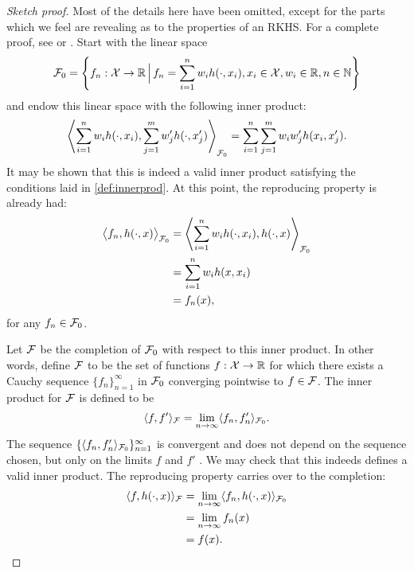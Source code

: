 \begin{proof}[Sketch proof]
  Most of the details here have been omitted, except for the parts which we feel are revealing as to the properties of an RKHS.
  For a complete proof, see \citet[Thm. 2.3]{gu2013smoothing} or  \citet[Thm. 3]{berlinet2011reproducing}.
  Start with the linear space
  \[
    {\mathcal F}_0 = \left\{ f_n:{\mathcal X}\to\mathbb{R} \, \Big| \, f_n = \sum_{i=1}^n w_i h(\cdot,x_i), x_i\in{\mathcal X}, w_i\in\mathbb{R}, n\in\mathbb{N} \right\}
  \]
  and endow this linear space with the following inner product:
  \[\label{eq:rkhsinnerprod}
    \left\langle \sum_{i=1}^n w_i h(\cdot,x_i), \sum_{j=1}^m w_j' h(\cdot,x_j') \right\rangle_{{\mathcal F}_0} = \sum_{i=1}^n\sum_{j=1}^m w_i w_j' h(x_i,x_j').
  \]
  It may be shown that this is indeed a valid inner product satisfying the conditions laid in \cref{def:innerprod}.
  At this point, the reproducing property is already had:   \begin{align*}
    \big\langle f_n, h(\cdot,x) \big\rangle_{{\mathcal F}_0} 
    &= \left\langle \sum_{i=1}^n w_i h(\cdot,x_i), h(\cdot,x) \right\rangle_{{\mathcal F}_0} \\
    &= \sum_{i=1}^n w_i h(x,x_i) \\
    &= f_n(x),
  \end{align*}
  for any $f_n\in{\mathcal F}_0$.
  
  Let ${\mathcal F}$ be the completion of ${\mathcal F}_0$ with respect to this inner product.
  In other words, define ${\mathcal F}$ to be the set of functions $f:{\mathcal X}\to\mathbb{R}$ for which there exists a Cauchy sequence $\{f_n\}_{n=1}^\infty$ in ${\mathcal F}_0$ converging pointwise to $f \in {\mathcal F}$.
  The inner product for ${\mathcal F}$ is defined to be
  \[
    \langle f,f'\rangle_{\mathcal F} = \lim_{n\to\infty} \langle f_n,f_n'\rangle_{{\mathcal F}_0}.
  \]
  The sequence $\{ \langle f_n,f_n'\rangle_{{\mathcal F}_0} \}_{n=1}^\infty$ is convergent and does not depend on the sequence chosen, but only on the limits $f$ and $f'$ \citep[Lemma 5]{berlinet2011reproducing}.
  We may check that this indeeds defines a valid inner product.
  The reproducing property carries over to the completion:
  \begin{align*}
    \langle f,h(\cdot,x)\rangle_{\mathcal F} 
    &= \lim_{n\to\infty} \langle f_n,h(\cdot,x)\rangle_{{\mathcal F}_0} \\
    &= \lim_{n\to\infty} f_n(x) \\
    &= f(x).
  \end{align*}
  

\end{proof}

